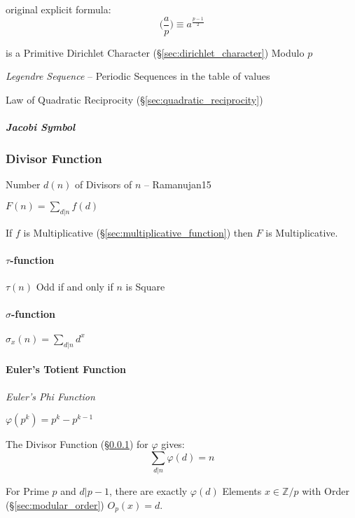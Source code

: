 original explicit formula:
\[
  \Big(\frac{a}{p}\Big) \equiv a^{\frac{p-1}{2}}
\]

is a Primitive Dirichlet Character (\S\ref{sec:dirichlet_character}) Modulo $p$

\emph{Legendre Sequence} -- Periodic Sequences in the table of values

\fist Law of Quadratic Reciprocity (\S\ref{sec:quadratic_reciprocity})



\subparagraph{Jacobi Symbol}\label{sec:jacobi_symbol}\hfill



\subsubsection{Divisor Function}\label{sec:divisor_function}

Number $d(n)$ of Divisors of $n$ -- Ramanujan15

$F(n) = \sum_{d|n}f(d)$

If $f$ is Multiplicative (\S\ref{sec:multiplicative_function}) then
$F$ is Multiplicative.



\paragraph{$\tau$-function}\label{sec:tau_function}\hfill

$\tau(n)$ Odd if and only if $n$ is Square



\paragraph{$\sigma$-function}\label{sec:sigma_function}\hfill

$\sigma_x(n) = \sum_{d | n} d^x$



\paragraph{Euler's Totient Function}\label{sec:eulers_totient}\hfill

\emph{Euler's Phi Function}

$\varphi(p^k) = p^k - p^{k-1}$

The Divisor Function (\S\ref{sec:divisor_function}) for $\varphi$
gives:
\[
  \sum_{d|n}\varphi(d) = n
\]

For Prime $p$ and $d|p-1$, there are exactly $\varphi(d)$ Elements $x
\in \mathbb{Z}/p$ with Order (\S\ref{sec:modular_order}) $O_p(x) = d$.

